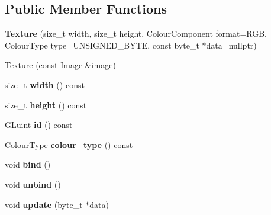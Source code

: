\subsection*{Public Member Functions}
\begin{DoxyCompactItemize}
\item 
\hypertarget{classs9_1_1gl_1_1Texture_a3526c1107953f08fc08902323ecf729a}{{\bfseries Texture} (size\-\_\-t width, size\-\_\-t height, Colour\-Component format=R\-G\-B, Colour\-Type type=U\-N\-S\-I\-G\-N\-E\-D\-\_\-\-B\-Y\-T\-E, const byte\-\_\-t $\ast$data=nullptr)}\label{classs9_1_1gl_1_1Texture_a3526c1107953f08fc08902323ecf729a}

\item 
\hyperlink{classs9_1_1gl_1_1Texture_a169bf6c0f7958eee33cf1d60ba0c7806}{Texture} (const \hyperlink{classs9_1_1Image}{Image} \&image)
\item 
\hypertarget{classs9_1_1gl_1_1Texture_ab82700fa4e4736c1fb77126e38b433ec}{size\-\_\-t {\bfseries width} () const }\label{classs9_1_1gl_1_1Texture_ab82700fa4e4736c1fb77126e38b433ec}

\item 
\hypertarget{classs9_1_1gl_1_1Texture_af4f31ed39114c6e483a2d02daadf30b1}{size\-\_\-t {\bfseries height} () const }\label{classs9_1_1gl_1_1Texture_af4f31ed39114c6e483a2d02daadf30b1}

\item 
\hypertarget{classs9_1_1gl_1_1Texture_a739f6f9b66d3b17976040eddc5106f2e}{G\-Luint {\bfseries id} () const }\label{classs9_1_1gl_1_1Texture_a739f6f9b66d3b17976040eddc5106f2e}

\item 
\hypertarget{classs9_1_1gl_1_1Texture_a17a79554dbc6901d0e3ea0fed53c951a}{Colour\-Type {\bfseries colour\-\_\-type} () const }\label{classs9_1_1gl_1_1Texture_a17a79554dbc6901d0e3ea0fed53c951a}

\item 
\hypertarget{classs9_1_1gl_1_1Texture_a3840dc7429982ffaddeafc8d62345b5d}{void {\bfseries bind} ()}\label{classs9_1_1gl_1_1Texture_a3840dc7429982ffaddeafc8d62345b5d}

\item 
\hypertarget{classs9_1_1gl_1_1Texture_a8480eed7ed703a937c3e6ab528f559bd}{void {\bfseries unbind} ()}\label{classs9_1_1gl_1_1Texture_a8480eed7ed703a937c3e6ab528f559bd}

\item 
\hypertarget{classs9_1_1gl_1_1Texture_aba2a44f5f3ebfff88cfe73d5eddf499d}{void {\bfseries update} (byte\-\_\-t $\ast$data)}\label{classs9_1_1gl_1_1Texture_aba2a44f5f3ebfff88cfe73d5eddf499d}

\end{DoxyCompactItemize}
